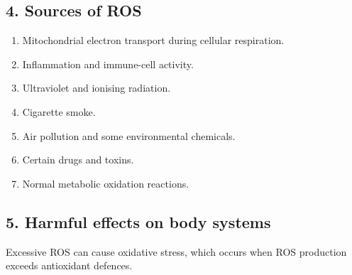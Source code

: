 \documentclass[11pt]{article}
\begin{document}
\subsection*{4. Sources of ROS}
\begin{enumerate}
    \item Mitochondrial electron transport during cellular respiration.
    \item Inflammation and immune-cell activity.
    \item Ultraviolet and ionising radiation.
    \item Cigarette smoke.
    \item Air pollution and some environmental chemicals.
    \item Certain drugs and toxins.
    \item Normal metabolic oxidation reactions.
\end{enumerate}

\subsection*{5. Harmful effects on body systems}
Excessive ROS can cause oxidative stress, which occurs when ROS production exceeds antioxidant defences.
\end{document}
